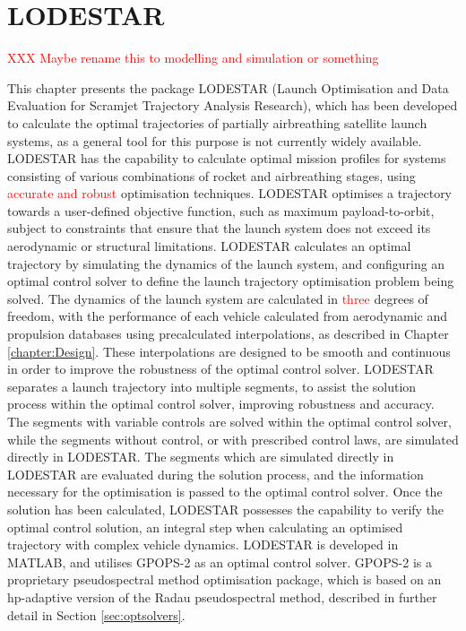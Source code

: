 
\cleardoublepage
\chapter{LODESTAR}\label{chapter:LODESTAR}
\textcolor{red}{XXX Maybe rename this to modelling and simulation or something}

This chapter presents the package LODESTAR (Launch Optimisation and Data Evaluation for Scramjet Trajectory Analysis Research), which has been developed to calculate the optimal trajectories of partially airbreathing satellite launch systems, as a general tool for this purpose is not currently widely available. LODESTAR has the capability to calculate optimal mission profiles for systems consisting of various combinations of rocket and airbreathing stages, using \textcolor{red}{accurate and robust} optimisation techniques. 
LODESTAR optimises a trajectory towards a user-defined objective function, such as maximum payload-to-orbit, subject to constraints that ensure that the launch system does not exceed its aerodynamic or structural limitations.
LODESTAR calculates an optimal trajectory by simulating the dynamics of the launch system, and configuring an optimal control solver to define the launch trajectory optimisation problem being solved. 
The dynamics of the launch system are calculated in \textcolor{red}{three} degrees of freedom, with the performance of each vehicle calculated from aerodynamic and propulsion databases using precalculated interpolations, as described in Chapter \ref{chapter:Design}. These interpolations are designed to be smooth and continuous in order to improve the robustness of the optimal control solver.
LODESTAR separates a launch trajectory into multiple segments, to assist the solution process within the optimal control solver, improving robustness and accuracy. The segments with variable controls are solved within the optimal control solver, while the segments without control, or with prescribed control laws, are simulated directly in LODESTAR.
The segments which are simulated directly in LODESTAR are evaluated during the solution process, and the information necessary for the optimisation is passed to the optimal control solver.
Once the solution has been calculated, LODESTAR possesses the capability to verify the optimal control solution, an integral step when calculating an optimised trajectory with complex vehicle dynamics. 
LODESTAR is developed in MATLAB, and utilises GPOPS-2\cite{Patterson2015} as an optimal control solver. GPOPS-2 is a proprietary pseudospectral method optimisation package, which is based on an \textsf{hp}-adaptive version of the Radau pseudospectral method, described in further detail in Section \ref{sec:optsolvers}. 


